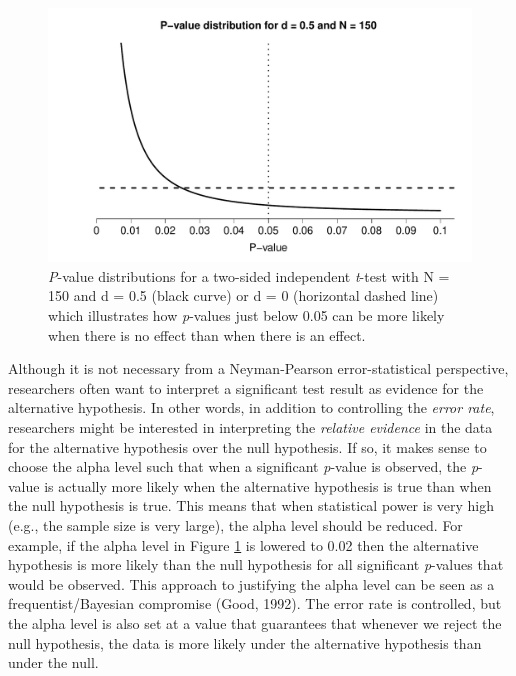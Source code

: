 \documentclass[
  english,
  ,man, a4paper,floatsintext]{apa6}
\begin{document}
\begin{figure}
\centering
\includegraphics{Justify_in_Practice_files/figure-latex/p-plot-1.pdf}
\caption{\label{fig:p-plot}\emph{P}-value distributions for a two-sided independent \emph{t}-test with N = 150 and d = 0.5 (black curve) or d = 0 (horizontal dashed line) which illustrates how \emph{p}-values just below 0.05 can be more likely when there is no effect than when there is an effect.}
\end{figure}

Although it is not necessary from a Neyman-Pearson error-statistical perspective, researchers often want to interpret a significant test result as evidence for the alternative hypothesis. In other words, in addition to controlling the \emph{error rate}, researchers might be interested in interpreting the \emph{relative evidence} in the data for the alternative hypothesis over the null hypothesis. If so, it makes sense to choose the alpha level such that when a significant \emph{p}-value is observed, the \emph{p}-value is actually more likely when the alternative hypothesis is true than when the null hypothesis is true. This means that when statistical power is very high (e.g., the sample size is very large), the alpha level should be reduced. For example, if the alpha level in Figure \ref{fig:p-plot} is lowered to 0.02 then the alternative hypothesis is more likely than the null hypothesis for all significant \emph{p}-values that would be observed. This approach to justifying the alpha level can be seen as a frequentist/Bayesian compromise (Good, 1992). The error rate is controlled, but the alpha level is also set at a value that guarantees that whenever we reject the null hypothesis, the data is more likely under the alternative hypothesis than under the null.
\end{document}
